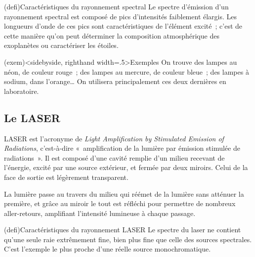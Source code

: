 \documentclass[../../main/main.tex]{subfiles}
\begin{document}
\begin{tcb}(defi){Caractéristiques du rayonnement spectral}
	Le spectre d'émission d'un rayonnement spectral est composé de pics
	d'intensités faiblement élargis. Les longueurs d'onde de ces pics sont
	caractéristiques de l'élément excité~; c'est de cette manière qu'on peut
	déterminer la composition atmosphérique des exoplanètes ou caractériser les
	étoiles.
\end{tcb}
\begin{tcb}(exem)<sidebyside, righthand width=.5\linewidth>{Exemples}
	On trouve des lampes au néon, de couleur rouge~; des lampes au mercure, de
	couleur bleue~; des lampes à sodium, dans l'orange… On utilisera
	principalement ces deux dernières en laboratoire.
	\tcblower
	\begin{center}
		\pgfspectra[element=Hg,
		axis, axis color=white, axis font color=black,
		axis ticks=4, axis unit precision=2,
		axis label text={Longueur d'onde [$\si{nm}$]},
		back=white,
		label, label position=north west,
		label before text=Spectre d'émission de~,
		label after text=\ :]
		\label{fig:lamp_spec}
	\end{center}
\end{tcb}

\subsection{Le LASER}
LASER est l'acronyme de \textit{Light Amplification by Stimulated Emission of
	Radiations}, c'est-à-dire «~amplification de la lumière par émission stimulée de
radiations~». Il est composé d'une cavité remplie d'un milieu recevant de
l'énergie, excité par une source extérieur, et fermée par deux miroirs. Celui de
la face de sortie est légèrement transparent.

La lumière passe au travers du milieu qui réémet de la lumière sans atténuer la
première, et grâce au miroir le tout est réfléchi pour permettre de nombreux
aller-retours, amplifiant l'intensité lumineuse à chaque passage.

\begin{tcb}(defi){Caractéristiques du rayonnement LASER}
	Le spectre du laser ne contient qu'une seule raie extrêmement fine, bien
	plus fine que celle des sources spectrales. C'est l'exemple le plus proche
	d'une réelle source monochromatique.
\end{tcb}
\end{document}
